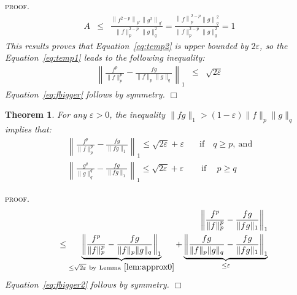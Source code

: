 \documentclass{article} %
\newcommand{\f}{f}
\newcommand{\g}{g}
\newcommand{\q}{q}
\def\p{p}
\newenvironment{proof}{\textsc{proof.}\it}{\hfill{$\Box$}}
\newtheorem{theorem}{Theorem}
\begin{document}
\begin{proof}
\begin{eqnarray}
A &\le&
	\frac{\left\|	\f^{2-\p} \right\|_{\p'} \left\|\g^2 \right\|_{\q'} }
		{\|\f\|^{2-\p}_\p \|\g\|_\q^2} 
	=
	\frac{\left\|	\f \right\|_{\p}^{2-\p} \left\|\g \right\|_{\q}^2 }
		{\|\f\|^{2-\p}_\p \|\g\|_\q^2}  = 1
\nonumber
\end{eqnarray}
This results proves that Equation~\eqref{eq:temp2} is upper bounded by $2\varepsilon$, so the Equation~\eqref{eq:temp1} leads to the following inequality:
\begin{eqnarray}
\left\|
	\frac{\f^{\p}}{\|\f\|^{\p}_{\p}} 
	- 
	\frac{\f\g}{\|\f\|_\p \|\g\|_\q} 
\right\|_1 &\le& 
\sqrt{2\varepsilon}
\label{eq:final}
\end{eqnarray}
Equation~\eqref{eq:fbigger} follows by symmetry. 
\end{proof}











\begin{theorem}  
\label{th:approx0}
For any $\varepsilon>0$, the inequality $\|\f\g\|_1> (1-\varepsilon) \|\f\|_\p \|\g\|_\q$ implies that:
\begin{align}
\left\|
	\frac{\f^{\p}}{\|\f\|^{\p}_{\p}} 
	- 
	\frac{\f\g}{\|\f\g\|_1} 
\right\|_1 \le \sqrt{2\varepsilon} + \varepsilon
\quad &  \mathrm{if} \quad \q\ge\p, \mathrm{\ and}
\nonumber
\\
\left\|
	\frac{\g^{\q}}{\|\g\|^{\q}_{\q}} 
	- 
	\frac{\f\g}{\|\f\g\|_1} 
\right\|_1 \le \sqrt{2\varepsilon} + \varepsilon
\quad  & \mathrm{\ if \ } \quad \p\ge\q
\label{eq:fbigger2}
\end{align}
\end{theorem} 



\begin{proof}
\begin{eqnarray}
&&\left\|
	\frac{\f^{\p}}{\|\f\|^{\p}_{\p}} 
	- 
	\frac{\f\g}{\|\f\g\|_1} 
\right\|_1
\nonumber\\
&&
\le 
\underbrace{
\left\|
	\frac{\f^{\p}}{\|\f\|^{\p}_{\p}} 
	- 
	\frac{\f\g}{\|\f\|_\p \|\g\|_\q} 
\right\|_1
}_{\le\sqrt{2\varepsilon}\ \mathrm{by~Lemma~\ref{lem:approx0} }}
+
\underbrace{
\left\|
	\frac{\f\g}{\|\f\|_\p \|\g\|_\q} 
	- 
	\frac{\f\g}{\|\f\g\|_1} 
\right\|_1
}_{\le \varepsilon}
\nonumber
\end{eqnarray}
Equation~\eqref{eq:fbigger2} follows by symmetry.
\end{proof}
\end{document}
